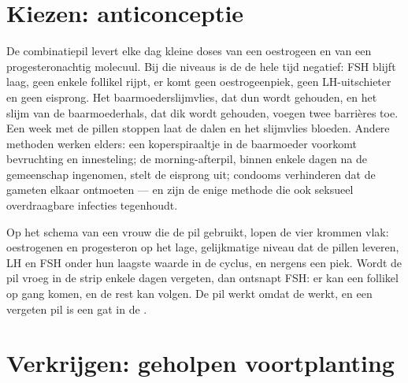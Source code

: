 \section{Kiezen: anticonceptie}

\begin{proposition}\label{prop:g11:hormones-and-reproduction:contraception}
De combinatiepil levert elke dag kleine doses van een oestrogeen en van
een progesteronachtig molecuul. Bij die niveaus is de  de
hele tijd negatief: FSH blijft laag, geen enkele follikel rijpt, er komt
geen oestrogeenpiek, geen LH-uitschieter en geen eisprong. Het
baarmoederslijmvlies, dat dun wordt gehouden, en het slijm van de
baarmoederhals, dat dik wordt gehouden, voegen twee barrières toe. Een
week met de pillen stoppen laat de  dalen en het slijmvlies
bloeden. Andere methoden werken elders: een koperspiraaltje in de
baarmoeder voorkomt bevruchting en innesteling; de morning-afterpil,
binnen enkele dagen na de gemeenschap ingenomen, stelt de eisprong uit;
condooms verhinderen dat de gameten elkaar ontmoeten --- en zijn de enige
methode die ook seksueel overdraagbare infecties tegenhoudt.
\end{proposition}
\admitted

\begin{example}\label{ex:g11:hormones-and-reproduction:pill}
Op het schema van een vrouw die de pil gebruikt, lopen de vier krommen
vlak: oestrogenen en progesteron op het lage, gelijkmatige niveau dat de
pillen leveren, LH en FSH onder hun laagste waarde in de cyclus, en
nergens een piek. Wordt de pil vroeg in de strip enkele dagen vergeten,
dan ontsnapt FSH: er kan een follikel op gang komen, en de rest kan
volgen. De pil werkt omdat de  werkt, en een vergeten pil
is een gat in de .
\end{example}

\section{Verkrijgen: geholpen voortplanting}

